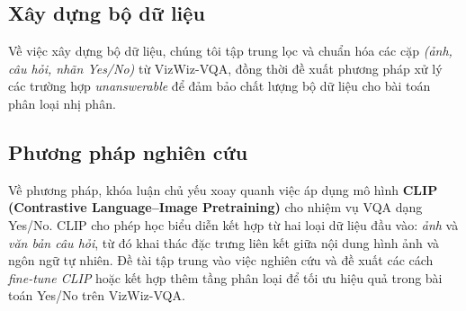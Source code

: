 \subsection{Xây dựng bộ dữ liệu}
Về việc xây dựng bộ dữ liệu, chúng tôi tập trung lọc và chuẩn hóa các cặp \textit{(ảnh, câu hỏi, nhãn Yes/No)} từ VizWiz-VQA, 
đồng thời đề xuất phương pháp xử lý các trường hợp \textit{unanswerable} để đảm bảo chất lượng bộ dữ liệu cho bài toán phân loại nhị phân.  

\subsection{Phương pháp nghiên cứu}
Về phương pháp, khóa luận chủ yếu xoay quanh việc áp dụng mô hình \textbf{CLIP (Contrastive Language--Image Pretraining)} cho nhiệm vụ VQA dạng Yes/No. 
CLIP cho phép học biểu diễn kết hợp từ hai loại dữ liệu đầu vào: \textit{ảnh} và \textit{văn bản câu hỏi}, từ đó khai thác đặc trưng liên kết giữa nội dung hình ảnh và ngôn ngữ tự nhiên. 
Đề tài tập trung vào việc nghiên cứu và đề xuất các cách \textit{fine-tune CLIP} hoặc kết hợp thêm tầng phân loại để tối ưu hiệu quả trong bài toán Yes/No trên VizWiz-VQA.


